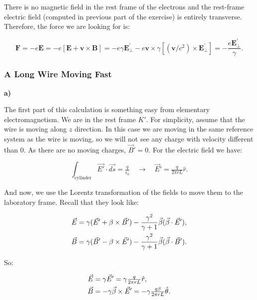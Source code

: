 There is no magnetic field in the rest frame of the electrons and the rest-frame electric field (computed in previous part of the exercise) is entirely transverse. Therefore, the force we are looking for is:

\begin{equation}
	\mathbf{F}=-e \mathbf{E}=-e[\mathbf{E}+\mathbf{v} \times \mathbf{B}]=-e \gamma \mathbf{E}_{\perp}^{\prime}-e \mathbf{v} \times \gamma\left[\left(\mathbf{v} / c^{2}\right) \times \mathbf{E}_{\perp}^{\prime}\right]=-\frac{e \mathbf{E}_{\perp}^{\prime}}{\gamma}.
\end{equation}

\subsubsection{A Long Wire Moving Fast}\label{A Long Wire Moving Fast}

\textbf{a)}

The first part of this calculation is something easy from elementary electromagnetism. We are in the rest frame $K'$. For simplicity, assume that the wire is moving along $z$ direction. In this case we are moving in the same reference system as the wire is moving, so we will not see any charge with velocity different than 0. As there are no moving charges, $\vec{B}' = 0.$ For the electric field we have:

\begin{equation}
	\int_{\mathrm{cylinder}} \vec{E'}\cdot\vec{ds} = \tfrac{q}{\epsilon_{0}} \quad \rightarrow \quad \vec{E}' = \tfrac{q}{2 \pi r L} \hat{r}.
\end{equation}

And now, we use the Lorentz transformation of the fields to move them to the laboratory frame. Recall that they look like:

\begin{equation}
	\begin{split}
		\vec{E} &= \gamma (\vec{E}' + \beta \times \vec{B}') - \frac{\gamma^{2}}{\gamma + 1}\vec{\beta} (\vec{\beta} \cdot \vec{E}'),\\
		\vec{B} &= \gamma (\vec{B}' - \beta \times \vec{E}') - \frac{\gamma^{2}}{\gamma + 1}\vec{\beta} (\vec{\beta} \cdot \vec{B}').
	\end{split}
\end{equation}

So:

\begin{equation}
	\begin{split}
		\vec{E} &= \gamma \vec{E}' = \gamma \tfrac{q}{2 \pi r L} \hat{r},\\
		\vec{B} &= -\gamma \vec{\beta} \times \vec{E}' = - \gamma \tfrac{q \beta}{2\pi r L} \hat{\theta}. 
	\end{split}
\end{equation}

